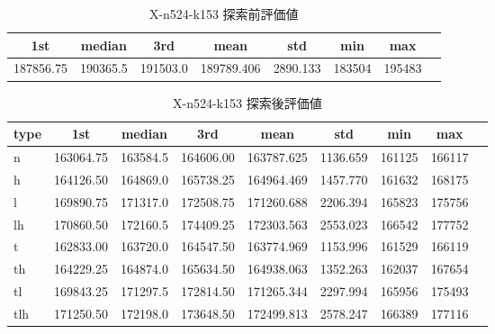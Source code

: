 \begin{table}[htbp]
    \caption{X-n524-k153 探索前評価値}
    \begin{tabular}{|l|l|l|l|l|l|l|l|}\hline
    \multicolumn{1}{|c|}{\textbf{1st}}
    &\multicolumn{1}{c|}{\textbf{median}}
    &\multicolumn{1}{c|}{\textbf{3rd}}
    &\multicolumn{1}{c|}{\textbf{mean}}
    &\multicolumn{1}{c|}{\textbf{std}}
    &\multicolumn{1}{c|}{\textbf{min}}
    &\multicolumn{1}{c|}{\textbf{max}}\\\hline
	187856.75 & 190365.5 & 191503.0 & 189789.406 & 2890.133 & 183504 & 195483\\\hline
	\end{tabular}
\end{table}
\begin{table}[htbp]
    \caption{X-n524-k153 探索後評価値}
    \begin{tabular}{|l|l|l|l|l|l|l|l|l|}\hline
    \multicolumn{1}{|c|}{\textbf{type}}
    &\multicolumn{1}{|c|}{\textbf{1st}}
    &\multicolumn{1}{c|}{\textbf{median}}
    &\multicolumn{1}{c|}{\textbf{3rd}}
    &\multicolumn{1}{c|}{\textbf{mean}}
    &\multicolumn{1}{c|}{\textbf{std}}
    &\multicolumn{1}{c|}{\textbf{min}}
    &\multicolumn{1}{c|}{\textbf{max}}\\\hline
	n & 163064.75 & 163584.5 & 164606.00 & 163787.625 & 1136.659 & 161125 & 166117\\\hline
	h & 164126.50 & 164869.0 & 165738.25 & 164964.469 & 1457.770 & 161632 & 168175\\\hline
	l & 169890.75 & 171317.0 & 172508.75 & 171260.688 & 2206.394 & 165823 & 175756\\\hline
	lh & 170860.50 & 172160.5 & 174409.25 & 172303.563 & 2553.023 & 166542 & 177752\\\hline
	t & 162833.00 & 163720.0 & 164547.50 & 163774.969 & 1153.996 & 161529 & 166119\\\hline
	th & 164229.25 & 164874.0 & 165634.50 & 164938.063 & 1352.263 & 162037 & 167654\\\hline
	tl & 169843.25 & 171297.5 & 172814.50 & 171265.344 & 2297.994 & 165956 & 175493\\\hline
	tlh & 171250.50 & 172198.0 & 173648.50 & 172499.813 & 2578.247 & 166389 & 177116\\\hline
	\end{tabular}
\end{table}
